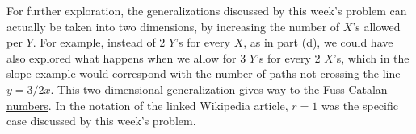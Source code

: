 \documentclass{article}
\begin{document}
For further exploration, the generalizations discussed by this week's problem can actually be taken into two dimensions, by increasing the number of $X$'s allowed per $Y$. For example, instead of $2$ $Y$'s for every $X$, as in part (d), we could have also explored what happens when we allow for $3$ $Y$'s for every $2$ $X$'s, which in the slope example would correspond with the number of paths not crossing the line $y = 3/2x$. This two-dimensional generalization gives way to the  \href{https://en.wikipedia.org/wiki/Fuss\%E2\%80\%93Catalan_number}{Fuss-Catalan numbers}. In the notation of the linked Wikipedia article, $r=1$ was the specific case discussed by this week's problem.
\end{document}

